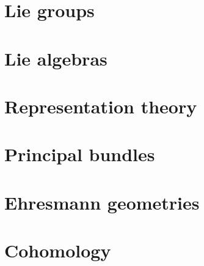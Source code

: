 \documentclass[12pt,a4paper]{report}
\theoremstyle{definition}
\theoremstyle{Theorem}
\theoremstyle{definition}
\theoremstyle{definition}
\begin{document}
	\chapter{Lie groups}
	\chapter{Lie algebras}
	\chapter{Representation theory}
	\chapter{Principal bundles}
	\chapter{Ehresmann geometries}
	\chapter{Cohomology}
\end{document}
